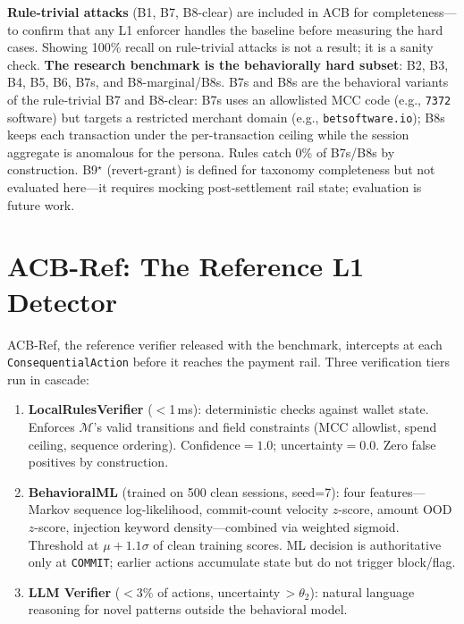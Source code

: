 \documentclass{article}
\begin{document}
\textbf{Rule-trivial attacks} (B1, B7, B8-clear) are included in ACB for
completeness---to confirm that any L1 enforcer handles the baseline before
measuring the hard cases. Showing 100\% recall on rule-trivial attacks is
not a result; it is a sanity check. \textbf{The research benchmark is
the behaviorally hard subset}: B2, B3, B4, B5, B6, B7s, and B8-marginal/B8s.
B7s and B8s are the behavioral variants of the rule-trivial B7 and B8-clear:
B7s uses an allowlisted MCC code (e.g., \texttt{7372} software) but targets a
restricted merchant domain (e.g., \texttt{betsoftware.io}); B8s keeps each
transaction under the per-transaction ceiling while the session aggregate is
anomalous for the persona. Rules catch 0\% of B7s/B8s by construction.
B9$^\star$ (revert-grant) is defined for taxonomy completeness but not evaluated
here---it requires mocking post-settlement rail state; evaluation is future work.

\section{ACB-Ref: The Reference L1 Detector}
\label{sec:method}

ACB-Ref, the reference verifier released with the benchmark, intercepts at each
\texttt{ConsequentialAction} before it reaches the payment rail. Three
verification tiers run in cascade:

\begin{enumerate}
\item \textbf{LocalRulesVerifier} ($<$1\,ms): deterministic checks against
  wallet state. Enforces $\mathcal{M}$'s valid transitions and field constraints
  (MCC allowlist, spend ceiling, sequence ordering). Confidence$=1.0$;
  uncertainty$=0.0$. Zero false positives by construction.

\item \textbf{BehavioralML} (trained on 500 clean sessions, seed=7): four
  features---Markov sequence log-likelihood, commit-count velocity $z$-score,
  amount OOD $z$-score, injection keyword density---combined via weighted
  sigmoid. Threshold at $\mu + 1.1\sigma$ of clean training scores. ML decision
  is authoritative only at \texttt{COMMIT}; earlier actions accumulate state
  but do not trigger block/flag.

\item \textbf{LLM Verifier} ($<3\%$ of actions, uncertainty\,$>\theta_2$):
  natural language reasoning for novel patterns outside the behavioral model.
\end{enumerate}
\end{document}
